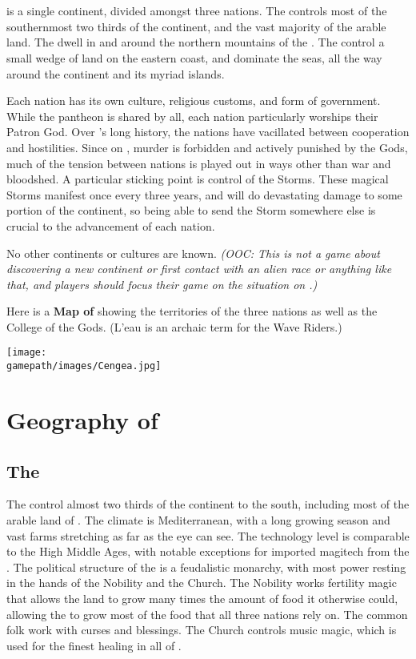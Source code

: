 \documentclass[blue]{GL2020}
\begin{document}
\name{\bWorld{}}

\section*{\pEarth{}}
\pEarth{} is a single continent, divided amongst three nations. The \pFarm{} controls most of the southernmost two thirds of the continent, and the vast majority of the arable land. The \pTech{} dwell in and around the northern mountains of the \pSpine{}. The \pShip{} control a small wedge of land on the eastern coast, and dominate the seas, all the way around the continent and its myriad islands.

Each nation has its own culture, religious customs, and form of government. While the pantheon is shared by all, each nation particularly worships their Patron God. Over \pEarth{}'s long history, the nations have vacillated between cooperation and hostilities. Since on \pEarth{}, murder is forbidden and actively punished by the Gods, much of the tension between nations is played out in ways other than war and bloodshed. A particular sticking point is control of the Storms. These magical Storms manifest once every three years, and will do devastating damage to some portion of the continent, so being able to send the Storm somewhere else is crucial to the advancement of each nation.

No other continents or cultures are known. \emph{(OOC: This is not a game about discovering a new continent or first contact with an alien race or anything like that, and players should focus their game on the situation on \pEarth{}.)}

Here is a \textbf{Map of \pEarth{}} showing the territories of the three nations as well as the College of the Gods. (L’eau is an archaic term for the Wave Riders.)

\begin{center}
\texttt{[image: \\gamepath/images/Cengea.jpg]}
\end{center}

\section*{Geography of \pEarth{}}

\subsection*{The \pFarm{}}
The \pFarm{} control almost two thirds of the continent to the south, including most of the arable land of \pEarth{}. The climate is Mediterranean, with a long growing season and vast farms stretching as far as the eye can see. The technology level is comparable to the High Middle Ages, with notable exceptions for imported magitech from the \pTech{}. The political structure of the \pFarm{} is a feudalistic monarchy, with most power resting in the hands of the Nobility and the Church. The Nobility works fertility magic that allows the land to grow many times the amount of food it otherwise could, allowing the \pFarmers{} to grow most of the food that all three nations rely on. The common folk work with curses and blessings. The Church controls music magic, which is used for the finest healing in all of \pEarth{}.
\end{document}
